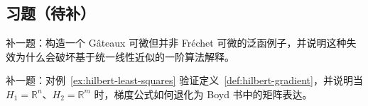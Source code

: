 \subsection*{习题（待补）}

\begin{exercise}\label{exr:gateaux-frechet-placeholder}
补一题：构造一个 Gâteaux 可微但并非 Fréchet 可微的泛函例子，并说明这种失效为什么会破坏基于统一线性近似的一阶算法解释。
\end{exercise}

\begin{exercise}\label{exr:hilbert-gradient-placeholder}
补一题：对例~\ref{ex:hilbert-least-squares} 验证定义~\ref{def:hilbert-gradient}，并说明当 $H_1=\mathbb R^n$、$H_2=\mathbb R^m$ 时，梯度公式如何退化为 Boyd 书中的矩阵表达。
\end{exercise}
